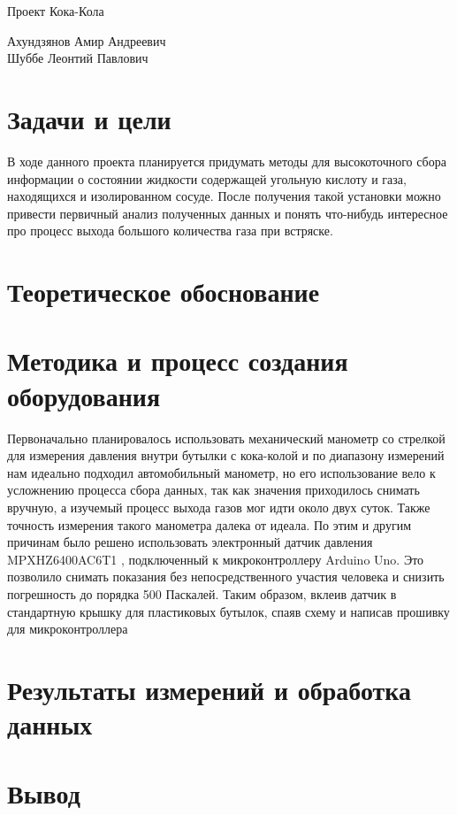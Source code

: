 \documentclass[12pt,a4paper]{scrartcl}
\begin{document}
\begin{center}
\begin{large}
Проект Кока-Кола
\end{large}
	\bigskip
     
Ахундзянов Амир Андреевич\\
Шуббе Леонтий Павлович
\end{center}

\section{Задачи и цели}
В ходе данного проекта планируется придумать методы для высокоточного сбора информации о состоянии жидкости  содержащей угольную кислоту и газа, находящихся и изолированном сосуде. После получения такой установки можно привести первичный анализ полученных данных и понять что-нибудь интересное про процесс выхода большого количества газа при встряске.

\section{Теоретическое обоснование}



\section{Методика и процесс создания оборудования}
Первоначально планировалось использовать механический манометр со стрелкой для измерения давления внутри бутылки с кока-колой и по диапазону измерений нам идеально подходил автомобильный манометр, но его использование вело к усложнению процесса сбора данных, так как значения приходилось снимать вручную, а изучемый процесс выхода газов мог идти около двух суток. Также точность измерения такого манометра далека от идеала. По этим и другим причинам было решено использовать электронный датчик давления MPXHZ6400AC6T1 , подключенный к микроконтроллеру Arduino Uno. Это позволило снимать показания без непосредственного участия человека и снизить погрешность до порядка 500 Паскалей. Таким образом, вклеив датчик в стандартную крышку для пластиковых бутылок, спаяв схему и написав прошивку для микроконтроллера


\section{Результаты измерений и обработка данных}



\section{Вывод}
\end{document}
